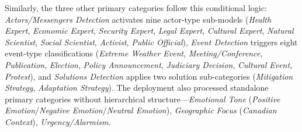 Similarly, the three other primary categories follow this conditional logic: \emph{Actors/Messengers Detection} activates nine actor-type sub-models (\emph{Health Expert}, \emph{Economic Expert}, \emph{Security Expert}, \emph{Legal Expert}, \emph{Cultural Expert}, \emph{Natural Scientist}, \emph{Social Scientist}, \emph{Activist}, \emph{Public Official}), \emph{Event Detection} triggers eight event-type classifications (\emph{Extreme Weather Event}, \emph{Meeting/Conference}, \emph{Publication}, \emph{Election}, \emph{Policy Announcement}, \emph{Judiciary Decision}, \emph{Cultural Event}, \emph{Protest}), and \emph{Solutions Detection} applies two solution sub-categories (\emph{Mitigation Strategy}, \emph{Adaptation Strategy}). The deployment also processed standalone primary categories without hierarchical structure—\emph{Emotional Tone} (\emph{Positive Emotion}/\emph{Negative Emotion}/\emph{Neutral Emotion}), \emph{Geographic Focus} (\emph{Canadian Context}), \emph{Urgency/Alarmism}. 

